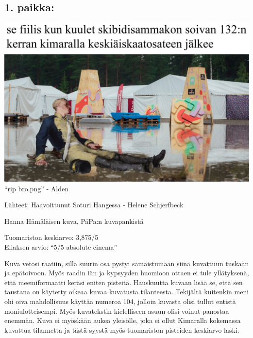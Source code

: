 \clearpage
\subsection*{1. paikka:}
\begin{center}
	\noindent\includegraphics[width=1.0\linewidth]{assets/kuvakilpailu1}\\
	``rip bro.png'' - Alden%
\end{center}

\noindent Lähteet: \quad Haavoittunut Soturi Hangessa - Helene Schjerfbeck

\qquad\qquad Hanna Hämäläisen kuva, PäPa:n kuvapankistä

\bigskip
\noindent Tuomariston keskiarvo: 3,875/5\\
\noindent Eliaksen arvio: ``5/5 absolute cinema''

\bigskip
\noindent Kuva vetosi raatiin, sillä suurin osa pystyi samaistumaan siinä
kuvattuun tuskaan ja epätoivoon. Myös raadin iän ja kypsyyden huomioon ottaen
ei tule yllätyksenä, että meemiformaatti keräsi eniten pisteitä. Hauskuutta
kuvaan lisää se, että sen taustana on käytetty oikeaa kuvaa kuvatusta
tilanteesta. Tekijältä kuitenkin meni ohi oiva mahdollisuus käyttää numeroa
104, jolloin kuvasta olisi tullut entistä moniulotteisempi. Myös kuvatekstin
kielelliseen asuun olisi voinut panostaa enemmän. Kuva ei myöskään aukea
yleisölle, joka ei ollut Kimaralla kokemassa kuvattua tilannetta ja tästä
syystä myös tuomariston pisteiden keskiarvo laski.

